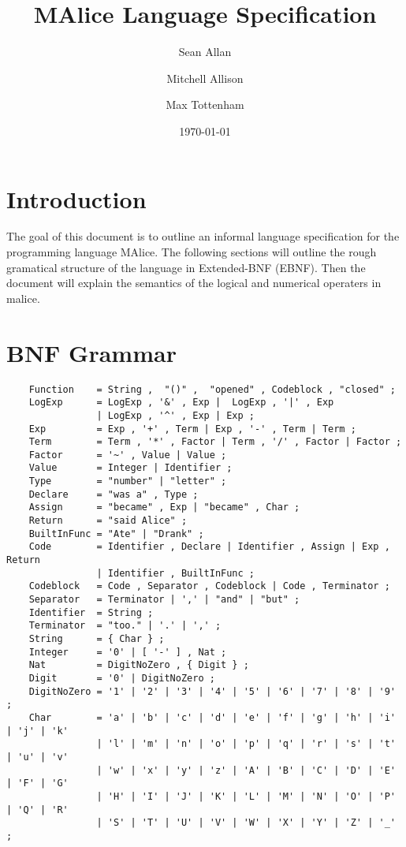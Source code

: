 \documentclass[a4wide, 10pt]{article}
\begin{document}
\title{MAlice Language Specification}

\author{Sean Allan \and Mitchell Allison \and Max Tottenham}

\date{\today}         %

\maketitle            %

\section{Introduction}
The goal of this document is to outline an informal language specification for 
the programming language MAlice. The following sections will outline the rough
gramatical structure of the language in Extended-BNF (EBNF). Then the 
document will explain the semantics of the logical and numerical operaters in malice.
\section{BNF Grammar} 
\begin{verbatim}
    Function    = String ,  "()" ,  "opened" , Codeblock , "closed" ;
    LogExp      = LogExp , '&' , Exp |  LogExp , '|' , Exp 
                | LogExp , '^' , Exp | Exp ;
    Exp         = Exp , '+' , Term | Exp , '-' , Term | Term ;
    Term        = Term , '*' , Factor | Term , '/' , Factor | Factor ;
    Factor      = '~' , Value | Value ;
    Value       = Integer | Identifier ;
    Type        = "number" | "letter" ;
    Declare     = "was a" , Type ;
    Assign      = "became" , Exp | "became" , Char ;
    Return      = "said Alice" ;
    BuiltInFunc = "Ate" | "Drank" ;
    Code        = Identifier , Declare | Identifier , Assign | Exp , Return  
                | Identifier , BuiltInFunc ;
    Codeblock   = Code , Separator , Codeblock | Code , Terminator ; 
    Separator   = Terminator | ',' | "and" | "but" ; 
    Identifier  = String ;
    Terminator  = "too." | '.' | ',' ;
    String      = { Char } ;
    Integer     = '0' | [ '-' ] , Nat ;
    Nat         = DigitNoZero , { Digit } ;
    Digit       = '0' | DigitNoZero ; 
    DigitNoZero = '1' | '2' | '3' | '4' | '5' | '6' | '7' | '8' | '9' ;
    Char        = 'a' | 'b' | 'c' | 'd' | 'e' | 'f' | 'g' | 'h' | 'i' | 'j' | 'k' 
                | 'l' | 'm' | 'n' | 'o' | 'p' | 'q' | 'r' | 's' | 't' | 'u' | 'v'
                | 'w' | 'x' | 'y' | 'z' | 'A' | 'B' | 'C' | 'D' | 'E' | 'F' | 'G'
                | 'H' | 'I' | 'J' | 'K' | 'L' | 'M' | 'N' | 'O' | 'P' | 'Q' | 'R'
                | 'S' | 'T' | 'U' | 'V' | 'W' | 'X' | 'Y' | 'Z' | '_' ;
\end{verbatim}
\end{document}
